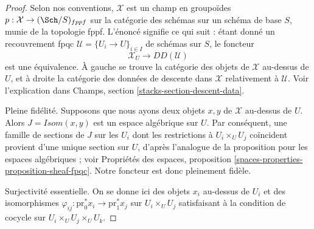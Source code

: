 \begin{proof}
Selon nos conventions, $\mathcal{X}$ est un champ
en groupoïdes $p : \mathcal{X} \to (\Sch/S)_{fppf}$
sur la catégorie des schémas sur un schéma de base $S$, munie
de la topologie fppf. L'énoncé signifie ce qui suit :
étant donné un recouvrement fpqc $\mathcal{U} = \{U_i \to U\}_{i \in I}$
de schémas sur $S$, le foncteur
$$
\mathcal{X}_U \longrightarrow DD(\mathcal{U})
$$
est une équivalence. À gauche se trouve la catégorie
des objets de $\mathcal{X}$ au-dessus de $U$, et à droite
la catégorie des données de descente dans $\mathcal{X}$ relativement à $\mathcal{U}$.
Voir l'explication dans Champs, section \ref{stacks-section-descent-data}.

\medskip\noindent
Pleine fidélité. Supposons que nous ayons deux objets $x, y$ de $\mathcal{X}$
au-dessus de $U$. Alors $J = \mathit{Isom}(x, y)$ est un espace algébrique sur $U$.
Par conséquent, une famille de sections de $J$ sur les $U_i$ dont les restrictions
à $U_i \times_U U_j$ coïncident provient d'une unique section sur $U$, d'après
l'analogue de la proposition pour les espaces algébriques ; voir
Propriétés des espaces, proposition
\ref{spaces-properties-proposition-sheaf-fpqc}.
Notre foncteur est donc pleinement fidèle.

\medskip\noindent
Surjectivité essentielle. On se donne ici des objets
$x_i$ au-dessus de $U_i$ et des isomorphismes
$\varphi_{ij} : \text{pr}_0^*x_i \to \text{pr}_1^*x_j$
sur $U_i \times_U U_j$ satisfaisant à la condition de cocycle
sur $U_i \times_U U_j \times_U U_k$.


\end{proof}
